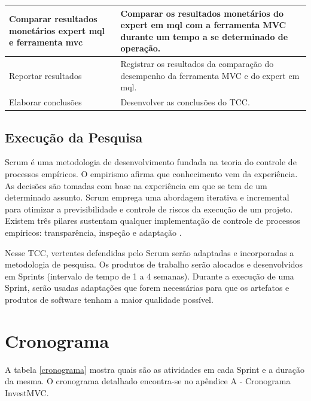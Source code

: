 \begin{table}[H]
\begin{center}
\begin{tabular}{ |  p{5cm} | p{9cm}|}
	Comparar resultados monetários expert mql e ferramenta mvc & Comparar os resultados monetários do expert em mql com a ferramenta MVC durante um tempo a se determinado de operação.\\ \hline
	Reportar resultados & Registrar os resultados da comparação do desempenho da ferramenta MVC e do expert em mql.\\ \hline
	Elaborar conclusões & Desenvolver as conclusões do TCC.\\ \hline
    \end{tabular}
    \end{center}
\label{atividadeMetologia}
\end{table}

\section{Execução da Pesquisa}

Scrum é uma metodologia de desenvolvimento fundada na teoria do controle de processos empíricos. O empirismo afirma que conhecimento vem da experiência. As decisões são tomadas com base na experiência em que se tem de um determinado assunto. Scrum emprega uma abordagem iterativa e incremental para otimizar a previsibilidade e controle de riscos da execução de um projeto. Existem três pilares sustentam qualquer implementação de controle de processos empíricos: transparência, inspeção e adaptação \cite[pág.~4]{schwaber2013}.

Nesse TCC, vertentes defendidas pelo Scrum serão adaptadas e incorporadas a metodologia de pesquisa. Os produtos de  trabalho serão alocados e desenvolvidos em Sprints (intervalo de tempo de 1 a 4 semanas). Durante a execução de uma Sprint, serão usadas adaptações que forem necessárias para que os artefatos e  produtos de software tenham a maior qualidade possível.

\chapter{Cronograma}

A tabela \ref{cronograma} mostra quais são as atividades em cada Sprint e a duração da mesma. O cronograma detalhado encontra-se no apêndice A - Cronograma InvestMVC.

